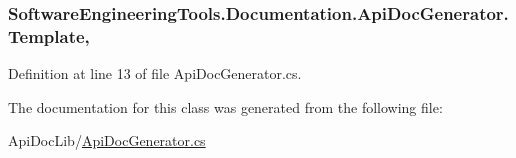 \hypertarget{class_software_engineering_tools_1_1_documentation_1_1_api_doc_generator_a38d0b57a5fd3a10ce73695874f2df980}{
\subsubsection[{Template}]{ Software\+Engineering\+Tools.\+Documentation.\+Api\+Doc\+Generator.\+Template\hspace{0.3cm}{\ttfamily [get]}, {\ttfamily [set]}}}\label{class_software_engineering_tools_1_1_documentation_1_1_api_doc_generator_a38d0b57a5fd3a10ce73695874f2df980}


Definition at line 13 of file Api\+Doc\+Generator.\+cs.



The documentation for this class was generated from the following file\+:\begin{DoxyCompactItemize}
\item 
Api\+Doc\+Lib/\hyperlink{_api_doc_generator_8cs}{Api\+Doc\+Generator.\+cs}\end{DoxyCompactItemize}
